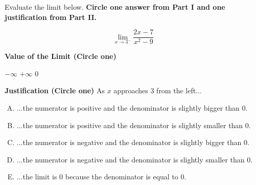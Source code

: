 \documentclass[12pt]{article}
\begin{document}
Evaluate the limit below.  
\textbf{Circle one answer from Part I and one justification from Part II.}

\[
\lim_{x \to 3^-} \frac{2x-7}{x^2-9}
\]

\medskip

\textbf{Value of the Limit (Circle one)}

\begin{center}

{\Large $\displaystyle -\infty$ \hspace{3cm} $\displaystyle +\infty$ \hspace{3cm} $\displaystyle 0$}

\end{center}

\medskip

\textbf{Justification (Circle one)} As $x$ approaches $3$ from the left...

\begin{enumerate}[(A)]
\item ...the numerator is positive and the denominator is slightly bigger than $0$.
\item ...the numerator is positive and the denominator is slightly smaller than $0$.
\item ...the numerator is negative and the denominator is slightly bigger than $0$.
\item ...the numerator is negative and the denominator is slightly smaller than $0$.
\item ...the limit is $0$ because the denominator is equal to $0$.
\end{enumerate}
\end{document}
